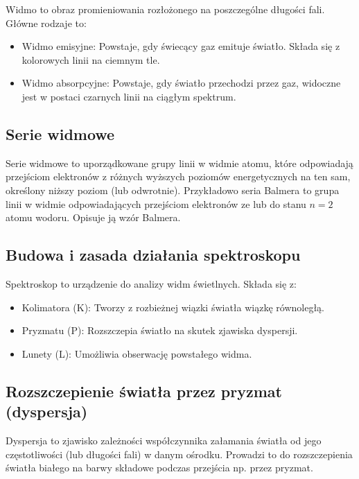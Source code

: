 \documentclass[a4paper,12pt]{article}
\begin{document}
Widmo to obraz promieniowania rozłożonego na poszczególne długości fali. Główne rodzaje to:

\begin{itemize}
    \item Widmo emisyjne: Powstaje, gdy świecący gaz emituje światło. Składa się z kolorowych linii na ciemnym tle.
    \item Widmo absorpcyjne: Powstaje, gdy światło przechodzi przez gaz, widoczne jest w postaci czarnych linii na ciągłym spektrum.~\citep{fizyka_dla_szkół_wyższych_tom_3}
\end{itemize}

\subsection*{Serie widmowe}

Serie widmowe to uporządkowane grupy linii w widmie atomu, które odpowiadają przejściom elektronów z różnych wyższych poziomów energetycznych na ten sam, określony niższy poziom (lub odwrotnie). Przykładowo seria Balmera to grupa linii w widmie odpowiadających przejściom elektronów ze lub do stanu $n=2$ atomu wodoru. Opisuje ją wzór Balmera. ~\citep{fizyka_dla_szkół_wyższych_tom_3}

\subsection*{Budowa i zasada działania spektroskopu}

Spektroskop to urządzenie do analizy widm świetlnych. Składa się z:

\begin{itemize}
    \item Kolimatora (K): Tworzy z rozbieżnej wiązki światła wiązkę równoległą.
    \item Pryzmatu (P): Rozszczepia światło na skutek zjawiska dyspersji.
    \item Lunety (L): Umożliwia obserwację powstałego widma.
\end{itemize}

\subsection*{Rozszczepienie światła przez pryzmat (dyspersja)}

Dyspersja to zjawisko zależności współczynnika załamania światła od jego częstotliwości (lub długości fali) w danym ośrodku. Prowadzi to do rozszczepienia światła białego na barwy składowe podczas przejścia np. przez pryzmat.~\citep{Drynski1976}
\end{document}
